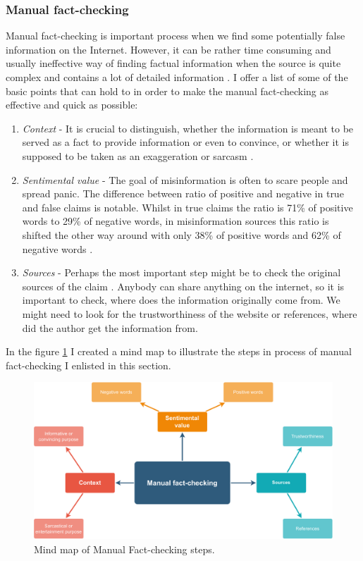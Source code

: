 \documentclass[11pt ,english,a4paper]{article}
\begin{document}
\subsubsection{Manual fact-checking}\label{tech:fact:man}
Manual fact-checking is important process when we find some potentially false information on the Internet. However, it can be rather time consuming and usually ineffective way of finding factual information when the source is quite complex and contains a lot of detailed information \cite{gu22fact}. I offer a list of some of the basic points that can hold to in order to make the manual fact-checking as effective and quick as possible:
\begin{enumerate}
\item{\emph{Context}} - It is crucial to distinguish, whether the information is meant to be served as a fact to provide information or even to convince, or whether it is supposed to be taken as an exaggeration or sarcasm \cite{alh18fact}.
\item {\emph{Sentimental value}} - The goal of misinformation is often to scare people and spread panic. The difference between ratio of positive and negative in true and false claims is notable. Whilst in true claims the ratio is 71\% of positive words to 29\% of negative words, in misinformation sources this ratio is shifted the other way around with only 38\% of positive words and 62\% of negative words \cite{bar21health}.
\item {\emph{Sources}} - Perhaps the most important step might be to check the original sources of the claim \cite{gra17fact}. Anybody can share anything on the internet, so it is important to check, where does the information originally come from. We might need to look for the trustworthiness of the website or references, where did the author get the information from.
\end{enumerate}
In the figure \ref{f:man_fact} I created a mind map to illustrate the steps in process of manual fact-checking I enlisted in this section.

\begin{figure}[H]
\centering
\includegraphics[scale=0.5]{manual_factchecking.pdf}
\caption{Mind map of Manual Fact-checking steps.}
\label{f:man_fact}
\end{figure}
\end{document}
